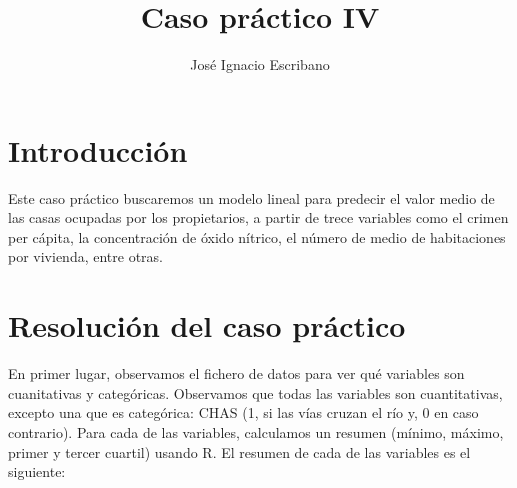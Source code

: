 \documentclass[12pt,a4paper,twoside,openright,titlepage,final]{article}
\author{José Ignacio Escribano}
\title{Caso práctico IV}
\begin{document}
\setcounter{page}{1}


\listoffigures
\thispagestyle{empty}
\newpage

\tableofcontents
\thispagestyle{empty}
\newpage


\setcounter{page}{1}

\section{Introducción}

Este caso práctico buscaremos un modelo lineal para predecir el valor medio de las casas ocupadas por los propietarios, a partir de trece variables como el crimen per cápita, la concentración de óxido nítrico, el número de medio de habitaciones por vivienda, entre otras. 

\section{Resolución del caso práctico}

En primer lugar, observamos el fichero de datos para ver qué variables son cuanitativas y categóricas. Observamos que todas las variables son cuantitativas, excepto una que es categórica: CHAS (1, si las vías cruzan el río y, 0 en caso contrario). Para cada de las variables, calculamos un resumen (mínimo, máximo, primer y tercer cuartil) usando R. El resumen de cada de las variables es el siguiente:
\end{document}
